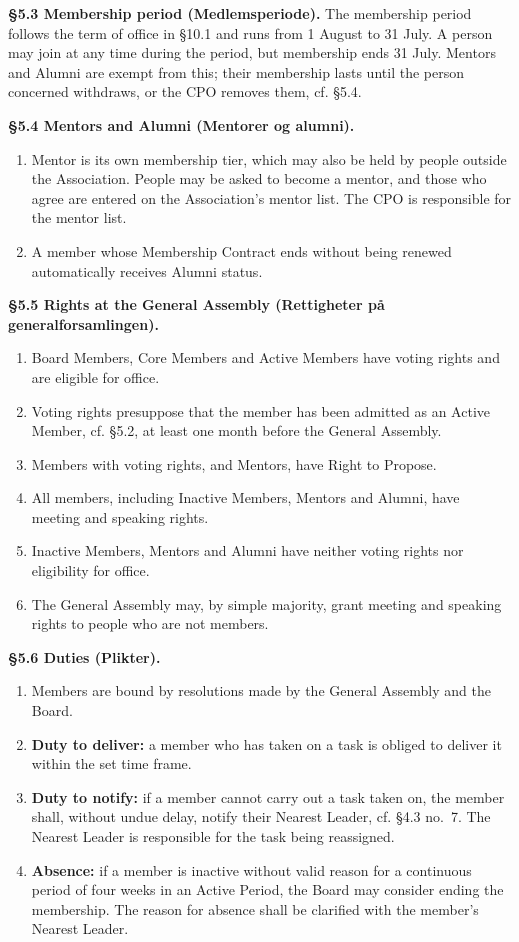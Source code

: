 \documentclass{../../../Common/Latex/Templates/rapport}
\begin{document}
\textbf{\S 5.3 Membership period (Medlemsperiode).} The membership period follows the term of office in \S10.1 and runs from 1 August to 31 July. A person may join at any time during the period, but membership ends 31 July. Mentors and Alumni are exempt from this; their membership lasts until the person concerned withdraws, or the CPO removes them, cf. \S5.4.

\textbf{\S 5.4 Mentors and Alumni (Mentorer og alumni).}
\begin{enumerate}
  \item Mentor is its own membership tier, which may also be held by people outside the Association. People may be asked to become a mentor, and those who agree are entered on the Association's mentor list. The CPO is responsible for the mentor list.
  \item A member whose Membership Contract ends without being renewed automatically receives Alumni status.
\end{enumerate}

\textbf{\S 5.5 Rights at the General Assembly (Rettigheter på generalforsamlingen).}
\begin{enumerate}
  \item Board Members, Core Members and Active Members have voting rights and are eligible for office.
  \item Voting rights presuppose that the member has been admitted as an Active Member, cf. \S5.2, at least one month before the General Assembly.
  \item Members with voting rights, and Mentors, have Right to Propose.
  \item All members, including Inactive Members, Mentors and Alumni, have meeting and speaking rights.
  \item Inactive Members, Mentors and Alumni have neither voting rights nor eligibility for office.
  \item The General Assembly may, by simple majority, grant meeting and speaking rights to people who are not members.
\end{enumerate}

\textbf{\S 5.6 Duties (Plikter).}
\begin{enumerate}
  \item Members are bound by resolutions made by the General Assembly and the Board.
  \item \textbf{Duty to deliver:} a member who has taken on a task is obliged to deliver it within the set time frame.
  \item \textbf{Duty to notify:} if a member cannot carry out a task taken on, the member shall, without undue delay, notify their Nearest Leader, cf. \S4.3 no.\ 7. The Nearest Leader is responsible for the task being reassigned.
  \item \textbf{Absence:} if a member is inactive without valid reason for a continuous period of four weeks in an Active Period, the Board may consider ending the membership. The reason for absence shall be clarified with the member's Nearest Leader.
\end{enumerate}
\end{document}
